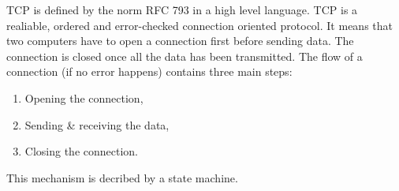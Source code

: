 \documentclass[a4paper, 10pt]{article}
\begin{document}
    TCP is defined by the norm RFC 793 \cite{rfc793} in a high level language.
    TCP is a realiable, ordered and error-checked connection oriented protocol.
    It means that two computers have to open a connection first before sending data.
    The connection is closed once all the data has been transmitted.
    The flow of a connection (if no error happens) contains three main steps:
    \begin{enumerate}
        \item Opening the connection,
        \item Sending \& receiving the data,
        \item Closing the connection.
    \end{enumerate}

    This mechanism is decribed by a state machine.
\end{document}
